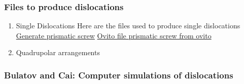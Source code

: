 \documentclass[11pt]{article}
\begin{document}
\subsubsection{Files to produce dislocations}
\label{sec:org6bf175b}
\begin{enumerate}
\item Single Dislocations
\label{sec:org769379a}
Here are the files used to produce single dislocations
\href{file:///home/tigany/Documents/disl\_gsurf/useful\_python/bop/dislocations/create\_dislocations/gen\_prismatic\_screw\_tbe.py}{Generate prismatic screw} \href{file:///home/tigany/Documents/disl\_gsurf/useful\_python/bop/dislocations/create\_dislocations/test/generated\_dislocations/site.ti\_9x\_9y\_8z\_square\_1\_dislanis\_prim\_rot\_convert.xyz}{Ovito file }
\href{file:///home/tigany/Pictures/prismatic\_screw\_tbe\_full\_anis.png}{prismatic screw from ovito }
\item Quadrupolar arrangements
\label{sec:org26c943b}
\end{enumerate}

\subsubsection{Bulatov and Cai: Computer simulations of dislocations}
\label{sec:org98f738d}
\end{document}
